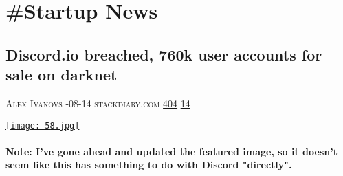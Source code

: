 \documentclass[10pt,a4paper]{article}
\begin{document}
\newpage
\section{\#Startup News}

\begin{multicols}{2}

\noindent\begin{minipage}{\linewidth}
\subsection{Discord.io breached, 760k user accounts for sale on darknet}
\textsc{\footnotesize
{\scriptsize\faUser}\space 
Alex Ivanovs 
{\scriptsize\faCalendar}-08-14 
{\scriptsize\faGlobe}\space 
stackdiary.com 
{\scriptsize\faThumbsOUp}\space 
\href{http://news.ycombinator.com/item?id=37124187\&utm\_term=comment}{404} 
{\scriptsize\faComments}\space 
\href{http://news.ycombinator.com/item?id=37124187\&utm\_term=comment}{14} 
}
\par\medskip\noindent
\href{https://stackdiary.com/the-data-of-760000-discord-io-users-was-put-up-for-sale-on-the-darknet/?utm\_source=hackernewsletter\&utm\_medium=email\&utm\_term=startup\_news}{
    \texttt{[image: 58.jpg]}
}
\end{minipage}
\paragraph{}
\textbf{Note: I've gone ahead and updated the featured image, so it doesn't seem like this has something to do with Discord "directly".}

\end{multicols}
\end{document}

